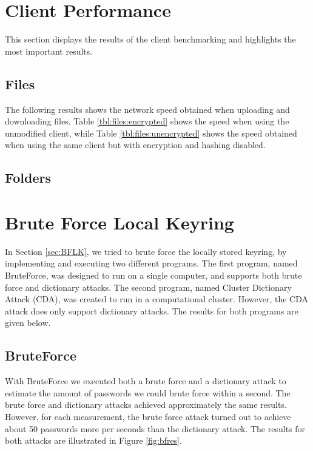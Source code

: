 \documentclass[pdftex,english,10pt,b5paper,twoside]{book}
\begin{document}
\section{Client Performance}
This section displays the results of the client benchmarking and highlights the
most important results.

\subsection{Files} The following results shows the network speed obtained when
uploading and downloading files. Table \ref{tbl:files:encrypted} shows the
speed when using the unmodified client, while Table \ref{tbl:files:unencrypted}
shows the speed obtained when using the same client but with encryption and
hashing disabled.





\subsection{Folders}





\section{Brute Force Local Keyring}
In Section \ref{sec:BFLK}, we tried to brute force the locally stored keyring,
by implementing and executing two different programs. The first program, named
BruteForce, was designed to run on a single computer, and supports both brute force and
dictionary attacks. The second program, named Cluster Dictionary Attack (CDA), was created to run in a
computational cluster. However, the CDA attack does only support dictionary attacks. The results for
both programs are given below.

\subsection{BruteForce}
With BruteForce we executed both a brute force and a dictionary attack to estimate the
amount of passwords we could brute force within a second. The brute force
and dictionary attacks achieved approximately the same results. However, for
each measurement, the brute force attack turned out to achieve about 50
passwords more per seconds than the dictionary attack. The results for both
attacks are illustrated in Figure \ref{fig:bfres}.
\end{document}
